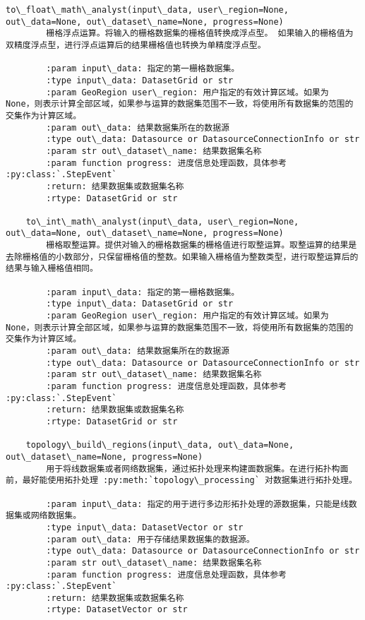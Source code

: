 \documentclass[11pt]{article}
\begin{document}
\begin{Verbatim}[commandchars=\\\{\}]
    to\_float\_math\_analyst(input\_data, user\_region=None, out\_data=None, out\_dataset\_name=None, progress=None)
        栅格浮点运算。将输入的栅格数据集的栅格值转换成浮点型。 如果输入的栅格值为双精度浮点型，进行浮点运算后的结果栅格值也转换为单精度浮点型。
        
        :param input\_data: 指定的第一栅格数据集。
        :type input\_data: DatasetGrid or str
        :param GeoRegion user\_region: 用户指定的有效计算区域。如果为 None，则表示计算全部区域，如果参与运算的数据集范围不一致，将使用所有数据集的范围的交集作为计算区域。
        :param out\_data: 结果数据集所在的数据源
        :type out\_data: Datasource or DatasourceConnectionInfo or str
        :param str out\_dataset\_name: 结果数据集名称
        :param function progress: 进度信息处理函数，具体参考 :py:class:`.StepEvent`
        :return: 结果数据集或数据集名称
        :rtype: DatasetGrid or str
    
    to\_int\_math\_analyst(input\_data, user\_region=None, out\_data=None, out\_dataset\_name=None, progress=None)
        栅格取整运算。提供对输入的栅格数据集的栅格值进行取整运算。取整运算的结果是去除栅格值的小数部分，只保留栅格值的整数。如果输入栅格值为整数类型，进行取整运算后的结果与输入栅格值相同。
        
        :param input\_data: 指定的第一栅格数据集。
        :type input\_data: DatasetGrid or str
        :param GeoRegion user\_region: 用户指定的有效计算区域。如果为 None，则表示计算全部区域，如果参与运算的数据集范围不一致，将使用所有数据集的范围的交集作为计算区域。
        :param out\_data: 结果数据集所在的数据源
        :type out\_data: Datasource or DatasourceConnectionInfo or str
        :param str out\_dataset\_name: 结果数据集名称
        :param function progress: 进度信息处理函数，具体参考 :py:class:`.StepEvent`
        :return: 结果数据集或数据集名称
        :rtype: DatasetGrid or str
    
    topology\_build\_regions(input\_data, out\_data=None, out\_dataset\_name=None, progress=None)
        用于将线数据集或者网络数据集，通过拓扑处理来构建面数据集。在进行拓扑构面前，最好能使用拓扑处理 :py:meth:`topology\_processing` 对数据集进行拓扑处理。
        
        :param input\_data: 指定的用于进行多边形拓扑处理的源数据集，只能是线数据集或网络数据集。
        :type input\_data: DatasetVector or str
        :param out\_data: 用于存储结果数据集的数据源。
        :type out\_data: Datasource or DatasourceConnectionInfo or str
        :param str out\_dataset\_name: 结果数据集名称
        :param function progress: 进度信息处理函数，具体参考 :py:class:`.StepEvent`
        :return: 结果数据集或数据集名称
        :rtype: DatasetVector or str
    

\end{Verbatim}
\end{document}
